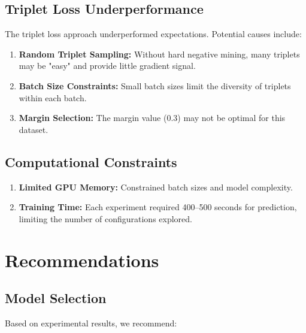 \documentclass[12pt,a4paper]{article}
\begin{document}
\subsection{Triplet Loss Underperformance}

The triplet loss approach underperformed expectations. Potential causes include:

\begin{enumerate}
    \item \textbf{Random Triplet Sampling:} Without hard negative mining, many triplets may be "easy" and provide little gradient signal.
    
    \item \textbf{Batch Size Constraints:} Small batch sizes limit the diversity of triplets within each batch.
    
    \item \textbf{Margin Selection:} The margin value (0.3) may not be optimal for this dataset.
\end{enumerate}

\subsection{Computational Constraints}

\begin{enumerate}
    \item \textbf{Limited GPU Memory:} Constrained batch sizes and model complexity.
    
    \item \textbf{Training Time:} Each experiment required 400--500 seconds for prediction, limiting the number of configurations explored.
\end{enumerate}

\section{Recommendations}
\label{sec:recommendations}

\subsection{Model Selection}

Based on experimental results, we recommend:
\end{document}
